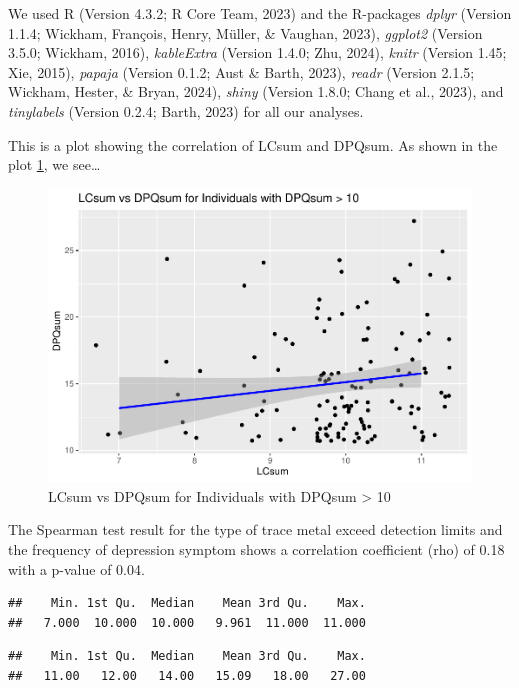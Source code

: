 \documentclass[
  man,floatsintext]{apa6}
\begin{document}
We used R (Version 4.3.2; R Core Team, 2023) and the R-packages \emph{dplyr} (Version 1.1.4; Wickham, François, Henry, Müller, \& Vaughan, 2023), \emph{ggplot2} (Version 3.5.0; Wickham, 2016), \emph{kableExtra} (Version 1.4.0; Zhu, 2024), \emph{knitr} (Version 1.45; Xie, 2015), \emph{papaja} (Version 0.1.2; Aust \& Barth, 2023), \emph{readr} (Version 2.1.5; Wickham, Hester, \& Bryan, 2024), \emph{shiny} (Version 1.8.0; Chang et al., 2023), and \emph{tinylabels} (Version 0.2.4; Barth, 2023) for all our analyses.

This is a plot showing the correlation of LCsum and DPQsum. As shown in the plot \ref{fig:LCDPQ-plot}, we see\ldots{}

\begin{figure}
\centering
\includegraphics{nhanes2017_files/figure-latex/LCDPQ-plot-1.pdf}
\caption{\label{fig:LCDPQ-plot}LCsum vs DPQsum for Individuals with DPQsum \textgreater{} 10}
\end{figure}

The Spearman test result for the type of trace metal exceed detection limits and the frequency of depression symptom shows a correlation coefficient (rho) of 0.18 with a p-value of 0.04.

\begin{verbatim}
##    Min. 1st Qu.  Median    Mean 3rd Qu.    Max. 
##   7.000  10.000  10.000   9.961  11.000  11.000
\end{verbatim}

\begin{verbatim}
##    Min. 1st Qu.  Median    Mean 3rd Qu.    Max. 
##   11.00   12.00   14.00   15.09   18.00   27.00
\end{verbatim}
\end{document}
